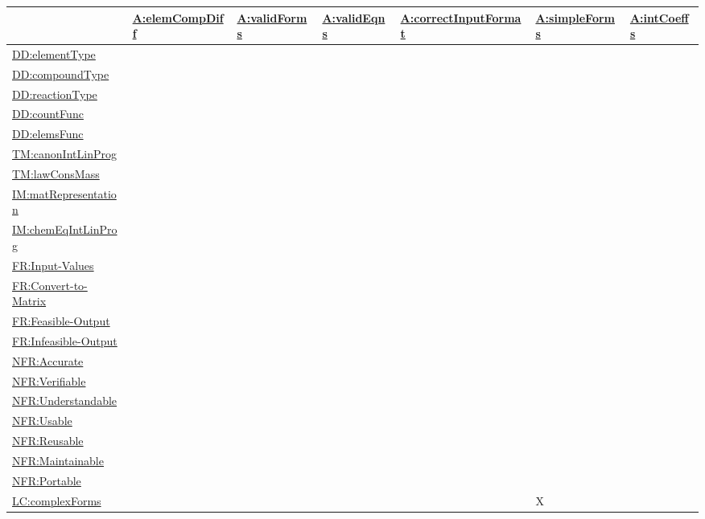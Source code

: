 \documentclass[12pt]{article}
\begin{document}
\begin{longtable}{l l l l l l l}
\toprule
\textbf{} & \textbf{\hyperref[elemCompDiff]{A:elemCompDiff}} & \textbf{\hyperref[validForms]{A:validForms}} & \textbf{\hyperref[validEqns]{A:validEqns}} & \textbf{\hyperref[correctInputFormat]{A:correctInputFormat}} & \textbf{\hyperref[simpleForms]{A:simpleForms}} & \textbf{\hyperref[intCoeffs]{A:intCoeffs}}
\\
\midrule
\endhead
\hyperref[DD:elementType]{DD:elementType} &  &  &  &  &  & 
\\
\hyperref[DD:compoundType]{DD:compoundType} &  &  &  &  &  & 
\\
\hyperref[DD:reactionType]{DD:reactionType} &  &  &  &  &  & 
\\
\hyperref[DD:countFunc]{DD:countFunc} &  &  &  &  &  & 
\\
\hyperref[DD:elemsFunc]{DD:elemsFunc} &  &  &  &  &  & 
\\
\hyperref[TM:canonIntLinProg]{TM:canonIntLinProg} &  &  &  &  &  & 
\\
\hyperref[TM:lawConsMass]{TM:lawConsMass} &  &  &  &  &  & 
\\
\hyperref[IM:matRepresentation]{IM:matRepresentation} &  &  &  &  &  & 
\\
\hyperref[IM:chemEqIntLinProg]{IM:chemEqIntLinProg} &  &  &  &  &  & 
\\
\hyperref[inputValues]{FR:Input-Values} &  &  &  &  &  & 
\\
\hyperref[convertMatrix]{FR:Convert-to-Matrix} &  &  &  &  &  & 
\\
\hyperref[feasOut]{FR:Feasible-Output} &  &  &  &  &  & 
\\
\hyperref[infeasOut]{FR:Infeasible-Output} &  &  &  &  &  & 
\\
\hyperref[accurate]{NFR:Accurate} &  &  &  &  &  & 
\\
\hyperref[verifiable]{NFR:Verifiable} &  &  &  &  &  & 
\\
\hyperref[understandable]{NFR:Understandable} &  &  &  &  &  & 
\\
\hyperref[usable]{NFR:Usable} &  &  &  &  &  & 
\\
\hyperref[reusable]{NFR:Reusable} &  &  &  &  &  & 
\\
\hyperref[maintainable]{NFR:Maintainable} &  &  &  &  &  & 
\\
\hyperref[portable]{NFR:Portable} &  &  &  &  &  & 
\\
\hyperref[complexForms]{LC:complexForms} &  &  &  &  & X & 
\\

\end{longtable}
\end{document}
